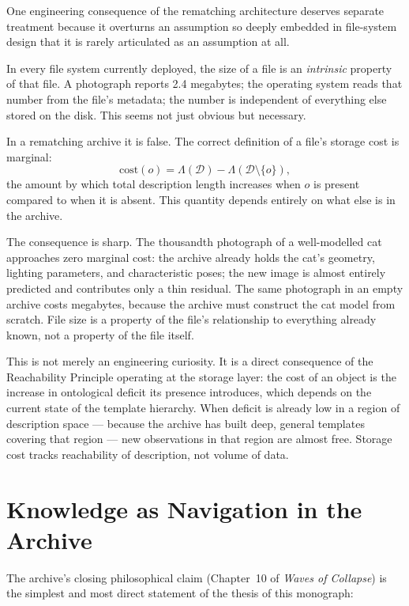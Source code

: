 \documentclass[11pt, a4paper, openany]{book}
\theoremstyle{plain}
\theoremstyle{definition}
\theoremstyle{remark}
\begin{document}
One engineering consequence of the rematching architecture deserves
separate treatment because it overturns an assumption so deeply embedded
in file-system design that it is rarely articulated as an assumption at all.

In every file system currently deployed, the size of a file is an
\emph{intrinsic} property of that file.
A photograph reports 2.4 megabytes; the operating system reads that number
from the file's metadata; the number is independent of everything else
stored on the disk.
This seems not just obvious but necessary.

In a rematching archive it is false.
The correct definition of a file's storage cost is marginal:
\begin{equation}
  \mathrm{cost}(o) = \Lambda(\mathcal{D}) - \Lambda(\mathcal{D} \setminus \{o\}),
  \label{eq:marginal-cost}
\end{equation}
the amount by which total description length increases when $o$ is present
compared to when it is absent.
This quantity depends entirely on what else is in the archive.

The consequence is sharp.
The thousandth photograph of a well-modelled cat approaches zero marginal cost:
the archive already holds the cat's geometry, lighting parameters, and
characteristic poses; the new image is almost entirely predicted and
contributes only a thin residual.
The same photograph in an empty archive costs megabytes, because the archive
must construct the cat model from scratch.
File size is a property of the file's relationship to everything
already known, not a property of the file itself.

This is not merely an engineering curiosity.
It is a direct consequence of the Reachability Principle operating at the
storage layer: the cost of an object is the increase in ontological deficit
its presence introduces, which depends on the current state of the
template hierarchy.
When deficit is already low in a region of description space --- because
the archive has built deep, general templates covering that region ---
new observations in that region are almost free.
Storage cost tracks reachability of description, not volume of data.

\section{Knowledge as Navigation in the Archive}

The archive's closing philosophical claim (Chapter~10 of \emph{Waves of Collapse})
is the simplest and most direct statement of the thesis of this monograph:
\end{document}
